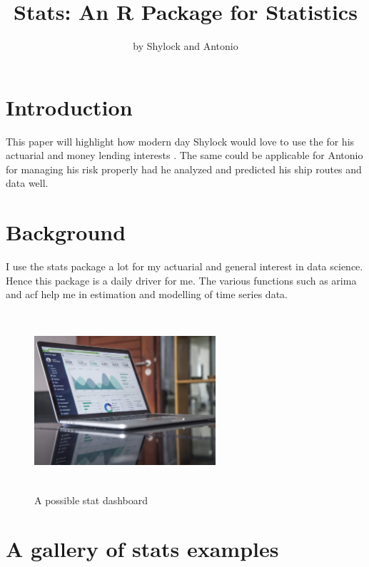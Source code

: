 \title{Stats: An R Package for Statistics}
\author{by Shylock and Antonio}

\maketitle


\hypertarget{introduction}{%
\section{Introduction}\label{introduction}}

This paper will highlight how modern day Shylock would love to use the
 for his actuarial and money lending interests . The same
could be applicable for Antonio for managing his risk properly had he
analyzed and predicted his ship routes and data well.

\hypertarget{background}{%
\section{Background}\label{background}}

I use the stats package a lot for my actuarial and general interest in
data science. Hence this package is a daily driver for me. The various
functions such as arima and acf help me in estimation and modelling of
time series data.

\begin{figure}
\centering
\includegraphics[width=0.6\textwidth,height=2.60417in]{stat.jpg}
\caption{A possible stat dashboard}
\end{figure}

\hypertarget{a-gallery-of-stats-examples}{%
\section{A gallery of stats
examples}\label{a-gallery-of-stats-examples}}

